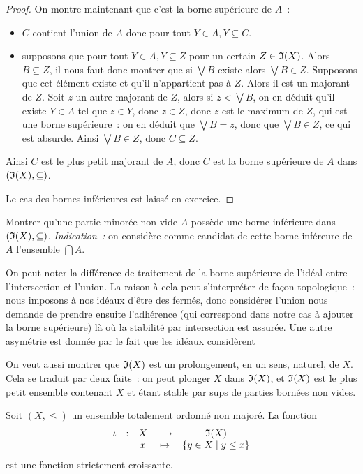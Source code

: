 \begin{proof}
  On montre maintenant que c'est la borne supérieure de $A$~:
  \begin{itemize}
  \item $C$ contient l'union de $A$ donc pour tout $Y\in A, Y\subseteq C$.
  \item supposons que pour tout $Y\in A, Y\subseteq Z$ pour un certain
    $Z\in \mathfrak{I}(X)$. Alors $B\subseteq Z$, il nous faut donc montrer que si
    $\bigvee B$ existe alors $\bigvee B \in Z$. Supposons que cet élément
    existe et qu'il n'appartient pas à $Z$. Alors il est un majorant de $Z$.
    Soit $z$ un autre majorant de $Z$, alors si $z < \bigvee B$, on en déduit
    qu'il existe $Y\in A$ tel que $z\in Y$, donc $z \in Z$, donc $z$ est le
    maximum de $Z$, qui est une borne supérieure~: on en déduit que
    $\bigvee B = z$, donc que $\bigvee B \in Z$, ce qui est absurde. Ainsi
    $\bigvee B \in Z$, donc $C\subseteq Z$.
  \end{itemize}
  Ainsi $C$ est le plus petit majorant de $A$, donc $C$ est la borne supérieure
  de $A$ dans $(\mathfrak{I}(X),\subseteq)$.

  Le cas des bornes inférieures est laissé en exercice.
\end{proof}

\begin{exercise}
  Montrer qu'une partie minorée non vide $A$ possède une borne inférieure dans
  $(\mathfrak{I}(X),\subseteq)$. \textit{Indication~:} on considère comme candidat de
  cette borne inféreure de $A$ l'ensemble $\bigcap A$.
\end{exercise}

\begin{remark}
  On peut noter la différence de traitement de la borne supérieure de l'idéal
  entre l'intersection et l'union. La raison à cela peut s'interpréter de façon
  topologique~: nous imposons à nos idéaux d'être des fermés, donc considérer
  l'union nous demande de prendre ensuite l'adhérence (qui correspond dans notre
  cas à ajouter la borne supérieure) là où la stabilité par intersection est
  assurée. Une autre asymétrie est donnée par le fait que les idéaux considèrent
\end{remark}

On veut aussi montrer que $\mathfrak{I}(X)$ est un prolongement, en un sens, naturel,
de $X$. Cela se traduit par deux faits~: on peut plonger $X$ dans $\mathfrak{I}(X)$,
et $\mathfrak{I}(X)$ est le plus petit ensemble contenant $X$ et étant stable par
sups de parties bornées non vides.

\begin{proposition}
  Soit $(X,\leq)$ un ensemble totalement ordonné non majoré. La fonction
  \[\begin{array}{ccccc}
  \iota & : & X & \longrightarrow & \mathfrak{I}(X)\\
  & & x &\mapsto & \{y \in X \mid y \leq x\}
  \end{array}\]
  est une fonction strictement croissante.
\end{proposition}

